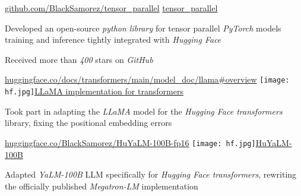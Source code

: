 
\begin{cventries}
  \cventry
    {\href{https://github.com/BlackSamorez/tensor_parallel}{\url{github.com/BlackSamorez/tensor_parallel}}} %
    {\faGithub\acvHeaderIconSep\href{https://github.com/BlackSamorez/tensor_parallel}{tensor\_parallel}} %
    {} %
    {} %
    {
      \begin{cvitems} %
        \item { Developed an open-source \textit{python library} for tensor parallel \textit{PyTorch} models training and inference tightly integrated with \textit{Hugging Face} }
        \item { Received more than \textit{400} stars on \textit{GitHub} }
      \end{cvitems}
    }

  \cventry
    {\href{https://huggingface.co/docs/transformers/main/model_doc/llama\#overview}{\url{huggingface.co/docs/transformers/main/model_doc/llama\#overview}}} %
    {\texttt{[image: hf.jpg]}\acvHeaderIconSep\href{https://huggingface.co/docs/transformers/main/model_doc/llama}{LLaMA implementation for transformers}} %
    {} %
    {} %
    {
      \begin{cvitems} %
        \item {Took part in adapting the \textit{LLaMA} model for the \textit{Hugging Face transformers} library, fixing the positional embedding errors}
      \end{cvitems}
    }

  \cventry
    {\href{https://huggingface.co/BlackSamorez/HuYaLM-100B-fp16}{\url{huggingface.co/BlackSamorez/HuYaLM-100B-fp16}}} %
    {\texttt{[image: hf.jpg]}\acvHeaderIconSep\href{https://huggingface.co/BlackSamorez/HuYaLM-100B-fp16}{HuYaLM-100B}} %
    {} %
    {} %
    {
      \begin{cvitems} %
        \item { Adapted \textit{YaLM-100B} LLM specifically for \textit{Hugging Face transformers}, rewriting the officially published \textit{Megatron-LM} implementation }
      \end{cvitems}
    }
    

\end{cventries}
